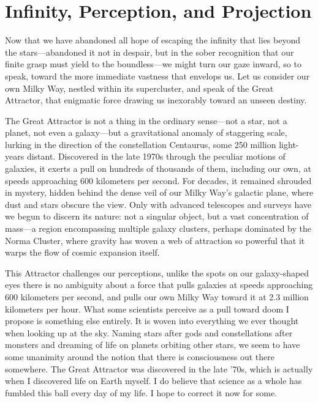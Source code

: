 \chapter{Infinity, Perception, and Projection}

Now that we have abandoned all hope of escaping the infinity that lies beyond the stars—abandoned it not in despair, but in the sober recognition that our finite grasp must yield to the boundless—we might turn our gaze inward, so to speak, toward the more immediate vastness that envelops us. Let us consider our own Milky Way, nestled within its supercluster, and speak of the Great Attractor, that enigmatic force drawing us inexorably toward an unseen destiny.

The Great Attractor is not a thing in the ordinary sense—not a star, not a planet, not even a galaxy—but a gravitational anomaly of staggering scale, lurking in the direction of the constellation Centaurus, some 250 million light-years distant. Discovered in the late 1970s through the peculiar motions of galaxies, it exerts a pull on hundreds of thousands of them, including our own, at speeds approaching 600 kilometers per second. For decades, it remained shrouded in mystery, hidden behind the dense veil of our Milky Way’s galactic plane, where dust and stars obscure the view. Only with advanced telescopes and surveys have we begun to discern its nature: not a singular object, but a vast concentration of mass—a region encompassing multiple galaxy clusters, perhaps dominated by the Norma Cluster, where gravity has woven a web of attraction so powerful that it warps the flow of cosmic expansion itself.

This Attractor challenges our perceptions, unlike the spots on our galaxy-shaped eyes there is no ambiguity about a force that pulls galaxies at speeds approaching 600 kilometers per second, and pulls our own Milky Way toward it at 2.3 million kilometers per hour. What some scientists perceive as a pull toward doom I propose is something else entirely. It is woven into everything we ever thought when looking up at the sky. Naming stars after gods and constellations after monsters and dreaming of life on planets orbiting other stars, we seem to have some unanimity around the notion that there is consciousness out there somewhere. The Great Attractor was discovered in the late ’70s, which is actually when I discovered life on Earth myself. I do believe that science as a whole has fumbled this ball every day of my life. I hope to correct it now for some.

